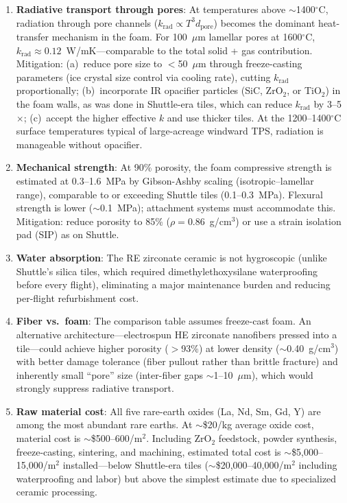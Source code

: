 \documentclass[12pt,letterpaper]{article}
\theoremstyle{definition}
\begin{document}
\begin{enumerate}
  \item \textbf{Radiative transport through pores}: At temperatures above $\sim$1400$^\circ$C, radiation through pore channels ($k_{\mathrm{rad}} \propto T^3 d_{\mathrm{pore}}$) becomes the dominant heat-transfer mechanism in the foam.  For 100~$\mu$m lamellar pores at 1600$^\circ$C, $k_{\mathrm{rad}} \approx 0.12$~W/mK---comparable to the total solid + gas contribution.  Mitigation: (a)~reduce pore size to $<$50~$\mu$m through freeze-casting parameters (ice crystal size control via cooling rate), cutting $k_{\mathrm{rad}}$ proportionally; (b)~incorporate IR opacifier particles (SiC, ZrO$_2$, or TiO$_2$) in the foam walls, as was done in Shuttle-era tiles, which can reduce $k_{\mathrm{rad}}$ by 3--5$\times$; (c)~accept the higher effective $k$ and use thicker tiles.  At the 1200--1400$^\circ$C surface temperatures typical of large-acreage windward TPS, radiation is manageable without opacifier.

  \item \textbf{Mechanical strength}: At 90\% porosity, the foam compressive strength is estimated at 0.3--1.6~MPa by Gibson-Ashby scaling (isotropic--lamellar range), comparable to or exceeding Shuttle tiles (0.1--0.3~MPa).  Flexural strength is lower ($\sim$0.1~MPa); attachment systems must accommodate this.  Mitigation: reduce porosity to 85\% ($\rho = 0.86$~g/cm$^3$) or use a strain isolation pad (SIP) as on Shuttle.

  \item \textbf{Water absorption}: The RE zirconate ceramic is not hygroscopic (unlike Shuttle's silica tiles, which required dimethylethoxysilane waterproofing before every flight), eliminating a major maintenance burden and reducing per-flight refurbishment cost.

  \item \textbf{Fiber vs.\ foam}: The comparison table assumes freeze-cast foam.  An alternative architecture---electrospun HE zirconate nanofibers pressed into a tile---could achieve higher porosity ($>$93\%) at lower density ($\sim$0.40~g/cm$^3$) with better damage tolerance (fiber pullout rather than brittle fracture) and inherently small ``pore'' size (inter-fiber gaps $\sim$1--10~$\mu$m), which would strongly suppress radiative transport.

  \item \textbf{Raw material cost}: All five rare-earth oxides (La, Nd, Sm, Gd, Y) are among the most abundant rare earths.  At $\sim$\$20/kg average oxide cost, material cost is $\sim$\$500--600/m$^2$.  Including ZrO$_2$ feedstock, powder synthesis, freeze-casting, sintering, and machining, estimated total cost is $\sim$\$5,000--15,000/m$^2$ installed---below Shuttle-era tiles ($\sim$\$20,000--40,000/m$^2$ including waterproofing and labor) but above the simplest estimate due to specialized ceramic processing.


\end{enumerate}
\end{document}
